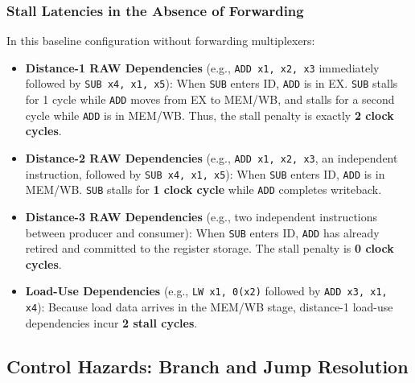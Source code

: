 \subsubsection{Stall Latencies in the Absence of Forwarding}
In this baseline configuration without forwarding multiplexers:
\begin{itemize}
    \item \textbf{Distance-1 RAW Dependencies} (e.g., \texttt{ADD x1, x2, x3} immediately followed by \texttt{SUB x4, x1, x5}): 
    When \texttt{SUB} enters ID, \texttt{ADD} is in EX. \texttt{SUB} stalls for 1 cycle while \texttt{ADD} moves from EX to MEM/WB, and stalls for a second cycle while \texttt{ADD} is in MEM/WB. Thus, the stall penalty is exactly \textbf{2 clock cycles}.
    \item \textbf{Distance-2 RAW Dependencies} (e.g., \texttt{ADD x1, x2, x3}, an independent instruction, followed by \texttt{SUB x4, x1, x5}): 
    When \texttt{SUB} enters ID, \texttt{ADD} is in MEM/WB. \texttt{SUB} stalls for \textbf{1 clock cycle} while \texttt{ADD} completes writeback.
    \item \textbf{Distance-3 RAW Dependencies} (e.g., two independent instructions between producer and consumer): 
    When \texttt{SUB} enters ID, \texttt{ADD} has already retired and committed to the register storage. The stall penalty is \textbf{0 clock cycles}.
    \item \textbf{Load-Use Dependencies} (e.g., \texttt{LW x1, 0(x2)} followed by \texttt{ADD x3, x1, x4}):
    Because load data arrives in the MEM/WB stage, distance-1 load-use dependencies incur \textbf{2 stall cycles}.
\end{itemize}


\subsection{Control Hazards: Branch and Jump Resolution}


